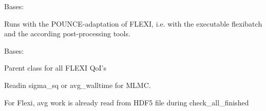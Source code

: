 \documentclass[letterpaper,10pt,english]{sphinxmanual}
\begin{document}
\begin{fulllineitems}
\label{\detokenize{solver:solver.flexi.Flexi}}
Bases: {\hyperref[\detokenize{solver:solver.solver.Solver}]{}}

Runs with the POUNCE-adaptation of FLEXI, i.e. with the 
executable flexibatch and the according post-processing tools.

\begin{fulllineitems}
\label{\detokenize{solver:solver.flexi.Flexi.QoI}}
Bases: {\hyperref[\detokenize{solver:solver.solver.QoI}]{}}

Parent class for all FLEXI QoI’s

\begin{fulllineitems}
\label{\detokenize{solver:solver.flexi.Flexi.QoI.defaults_}}
\end{fulllineitems}


\begin{fulllineitems}
\label{\detokenize{solver:solver.flexi.Flexi.QoI.get_derived_quantity}}
Readin sigma\_sq or avg\_walltime for MLMC.

\end{fulllineitems}


\begin{fulllineitems}
\label{\detokenize{solver:solver.flexi.Flexi.QoI.get_work_mean}}
For Flexi, avg work is already read from HDF5 file during 
check\_all\_finished


\end{fulllineitems}
\end{fulllineitems}
\end{fulllineitems}
\end{document}
